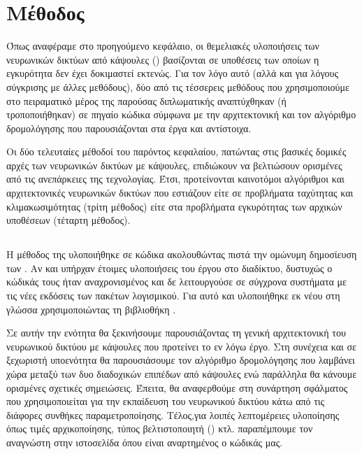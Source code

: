 \chapter{Μέθοδος}
\label{chap:method}

Όπως αναφέραμε στο προηγούμενο κεφάλαιο, οι θεμελιακές υλοποιήσεις των νευρωνικών δικτύων από κάψουλες (\cite{hinton2011transforming, sabour2017dynamic, hinton2018matrix}) βασίζονται σε υποθέσεις των οποίων η εγκυρότητα δεν έχει δοκιμαστεί εκτενώς. Για τον λόγο αυτό (αλλά και για λόγους σύγκρισης με άλλες μεθόδους), δύο από τις τέσσερεις μεθόδους που χρησιμοποιούμε στο πειραματικό μέρος της παρούσας διπλωματικής αναπτύχθηκαν (ή τροποποιήθηκαν) σε πηγαίο κώδικα σύμφωνα με την αρχιτεκτονική και τον αλγόριθμο δρομολόγησης που παρουσιάζονται στα έργα \cite{sabour2017dynamic} και \cite{hinton2018matrix} αντίστοιχα. \par

Οι δύο τελευταίες μέθοδοί του παρόντος κεφαλαίου, πατώντας στις βασικές δομικές αρχές των νευρωνικών δικτύων με κάψουλες, επιδιώκουν να βελτιώσουν ορισμένες από τις ανεπάρκειες της τεχνολογίας. Έτσι, προτείνονται καινοτόμοι αλγόριθμοι και αρχιτεκτονικές νευρωνικών δικτύων που εστιάζουν είτε σε προβλήματα ταχύτητας και κλιμακωσιμότητας (τρίτη μέθοδος) είτε στα προβλήματα εγκυρότητας των αρχικών υποθέσεων (τέταρτη μέθοδος).


\section{}
\label{sec:method_1}

Η μέθοδος της  υλοποιήθηκε σε κώδικα ακολουθώντας πιστά την ομώνυμη δημοσίευση των  \cite{sabour2017dynamic}. Αν και υπήρχαν έτοιμες υλοποιήσεις του έργου στο διαδίκτυο, δυστυχώς ο κώδικάς τους ήταν αναχρονισμένος και δε λειτουργούσε σε σύγχρονα συστήματα με τις νέες εκδόσεις των πακέτων λογισμικού. Για αυτό και υλοποιήθηκε εκ νέου στη γλώσσα  χρησιμοποιώντας τη βιβλιοθήκη . \par

Σε αυτήν την ενότητα θα ξεκινήσουμε παρουσιάζοντας τη γενική αρχιτεκτονική του νευρωνικού δικτύου με κάψουλες που προτείνει το εν λόγω έργο. Στη συνέχεια και σε ξεχωριστή υπο\textendash ενότητα θα παρουσιάσουμε τον αλγόριθμο δρομολόγησης που λαμβάνει χώρα μεταξύ των δυο διαδοχικών επιπέδων από κάψουλες ενώ παράλληλα θα κάνουμε ορισμένες σχετικές σημειώσεις. Έπειτα, θα αναφερθούμε στη συνάρτηση σφάλματος που χρησιμοποιείται για την εκπαίδευση του νευρωνικού δικτύου κάτω από τις διάφορες συνθήκες παραμετροποίησης. Τέλος,για λοιπές λεπτομέρειες υλοποίησης όπως τιμές αρχικοποίησης, τύπος βελτιστοποιητή () κτλ. παραπέμπουμε τον αναγνώστη στην ιστοσελίδα όπου είναι αναρτημένος ο κώδικάς μας.

